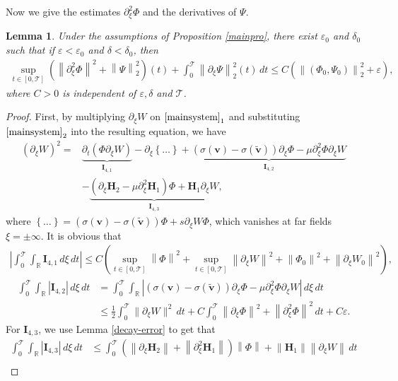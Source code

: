 \documentclass[12pt,reqno]{amsart}
\numberwithin{equation}{section}
\newcommand{\norm}[1]{\left\lVert #1 \right\rVert}
\newcommand{\subeqref}[2]{$ \eqref{#1}_{#2} $}
\def\p{\partial}
\def\R{\mathbb{R}}
\def\T{\mathcal{T}}
\def\supt{\mathop{sup}\limits_{t \in [0,\mathcal{T}]}}
\newtheorem{lemma}[theorem]{Lemma}
\begin{document}
Now we give the estimates $\p^2_{\xi}\Phi$ and the derivatives of $\Psi$.
\begin{lemma}\label{lowterm3}
	Under the assumptions of Proposition \ref{mainpro}, there exist $\varepsilon_0$ and $\delta_0$ such that if $\varepsilon<\varepsilon_0$ and $\delta<\delta_0$, then
	\begin{align*}
		\supt(\norm{\p^2_{\xi}\Phi}^2+\norm{\Psi}^2_2)(t)+\int_{0}^{\T} \norm{\p_{\xi}\Psi}^2_2(t)\,dt\leq C(\norm{(\Phi_0,\Psi_0)}^2_2+\varepsilon),
	\end{align*}
	where $C>0$ is independent of $\varepsilon,\delta$ and $\T$.
\end{lemma}
\begin{proof}
	First, by multiplying $\p_{\xi}W$ on \subeqref{mainsystem}{1} and substituting \subeqref{mainsystem}{2} into the resulting equation, we have
		\begin{equation}\label{relt4}
			\begin{aligned}
				(\p_{\xi}W)^2=&\underbrace{\p_t(\Phi\p_{\xi}W)}_{\mathbf{I}_{4,1}}-\p_{\xi}\left\{\dots\right\}+\underbrace{(\sigma(\mathbf{v})-\sigma(\mathbf{\tilde{v}}))\p_{\xi}\Phi-\mu\p^2_{\xi}\Phi\p_{\xi}W}_{\mathbf{I}_{4,2}}\\
				&-\underbrace{(\p_{\xi}\mathbf{H}_2-\mu\p^2_{\xi}\mathbf{H}_1)\Phi+\mathbf{H}_1\p_{\xi}W}_{\mathbf{I}_{4,3}},
			\end{aligned}
		\end{equation}
		where $\left\{\dots\right\}=(\sigma(\mathbf{v})-\sigma(\mathbf{\tilde{v}}))\Phi+s\p_{\xi}W\Phi$, which vanishes at far fields $\xi=\pm\infty$. 
		It is obvious that
		\begin{align*}
			\left|\int_{0}^{\T}\int_{\R} \mathbf{I}_{4,1}\,d\xi\,dt\right|\leq C(\supt\norm{\Phi}^2+\supt\norm{\p_{\xi}W}^2+\norm{\Phi_0}^2+\norm{\p_{\xi}W_0}^2),
		\end{align*}
		\begin{align*}
			\int_{0}^{\T}\int_{\R} |\mathbf{I}_{4,2}|\,d\xi\,dt&=\int_{0}^{\T}\int_{\R} |(\sigma(\mathbf{v})-\sigma(\mathbf{\tilde{v}}))\p_{\xi}\Phi-\mu\p^2_{\xi}\Phi\p_{\xi}W|\,d\xi\,dt\\
			&\leq \frac{1}{2}\int_{0}^{\T}\|\p_\xi W\|^2\,dt+C\int_{0}^{\T} \norm{\p_{\xi}\Phi}^2+\norm{\p_\xi^2\Phi}^2\,dt+C\varepsilon.
		\end{align*}
		For $\mathbf{I}_{4,3}$, we use Lemma \ref{decay-error} to get that
		\begin{align*}
			\int_{0}^{\T}\int_{\R} |\mathbf{I}_{4,3}|\,d\xi\,dt
			&\leq \int_{0}^{\T} (\norm{\p_{\xi}\mathbf{H}_2}+\norm{\p^2_{\xi}\mathbf{H}_1})\norm{\Phi}+\norm{\mathbf{H}_1}\norm{\p_{\xi}W}\,dt\\ 

\end{align*}
\end{proof}
\end{document}

